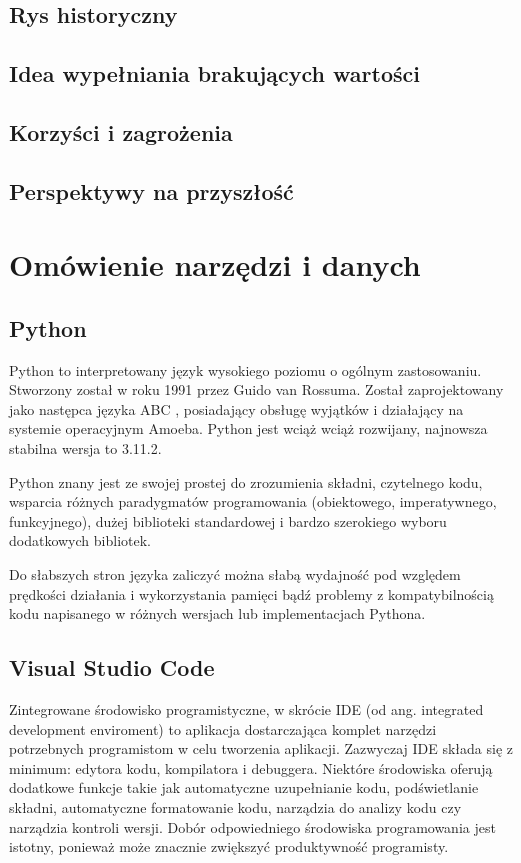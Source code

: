 \documentclass[12pt,twoside]{article}
\begin{document}
\subsection{Rys historyczny}
\subsection{Idea wypełniania brakujących wartości}
\subsection{Korzyści i zagrożenia}
\subsection{Perspektywy na przyszłość}
\clearpage


\section{Omówienie narzędzi i danych}

\subsection{Python}

Python to interpretowany język wysokiego poziomu o ogólnym zastosowaniu.
Stworzony został w roku 1991 przez Guido van Rossuma.
Został zaprojektowany jako następca języka ABC \cite{abc}, posiadający obsługę wyjątków i działający na systemie operacyjnym Amoeba. \cite{python2}
Python jest wciąż wciąż rozwijany, najnowsza stabilna wersja to 3.11.2.

Python znany jest ze swojej prostej do zrozumienia składni,
czytelnego kodu, wsparcia różnych paradygmatów programowania (obiektowego, imperatywnego, funkcyjnego),
dużej biblioteki standardowej i bardzo szerokiego wyboru dodatkowych bibliotek. \cite{python3}

Do słabszych stron języka zaliczyć można słabą wydajność pod względem prędkości działania i wykorzystania pamięci
bądź problemy z kompatybilnością kodu napisanego w różnych wersjach lub implementacjach Pythona. \cite{python3}

\subsection{Visual Studio Code}

Zintegrowane środowisko programistyczne, w skrócie IDE (od ang. integrated development enviroment)
to aplikacja dostarczająca komplet narzędzi potrzebnych programistom w celu tworzenia aplikacji.
Zazwyczaj IDE składa się z minimum: edytora kodu, kompilatora i debuggera.
Niektóre środowiska oferują dodatkowe funkcje takie jak automatyczne uzupełnianie kodu, podświetlanie składni,
automatyczne formatowanie kodu, narządzia do analizy kodu czy narządzia kontroli wersji.
Dobór odpowiedniego środowiska programowania jest istotny, ponieważ może znacznie zwiększyć produktywność programisty. \cite{ide}
\end{document}
